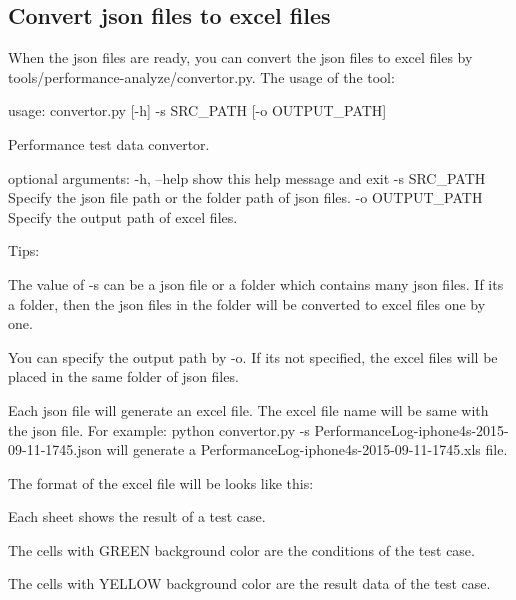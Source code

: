 \subsection*{Convert json files to excel files}

When the json files are ready, you can convert the json files to excel files by {\ttfamily tools/performance-\/analyze/convertor.\+py}. The usage of the tool\+:


\begin{DoxyCode}
usage: convertor.py [-h] -s SRC\_PATH [-o OUTPUT\_PATH]

Performance test data convertor.

optional arguments:
  -h, --help      show this help message and exit
  -s SRC\_PATH     Specify the json file path or the folder path of json files.
  -o OUTPUT\_PATH  Specify the output path of excel files.
\end{DoxyCode}


Tips\+:


\begin{DoxyItemize}
\item The value of {\ttfamily -\/s} can be a json file or a folder which contains many json files. If it\textquotesingle{}s a folder, then the json files in the folder will be converted to excel files one by one.
\item You can specify the output path by {\ttfamily -\/o}. If it\textquotesingle{}s not specified, the excel files will be placed in the same folder of json files.
\item Each json file will generate an excel file. The excel file name will be same with the json file. For example\+: {\ttfamily python convertor.\+py -\/s Performance\+Log-\/iphone4s-\/2015-\/09-\/11-\/1745.\+json} will generate a {\ttfamily Performance\+Log-\/iphone4s-\/2015-\/09-\/11-\/1745.\+xls} file.
\item The format of the excel file will be looks like this\+:


\begin{DoxyEnumerate}
\item Each sheet shows the result of a test case.
\item The cells with G\+R\+E\+EN background color are the conditions of the test case.
\item The cells with Y\+E\+L\+L\+OW background color are the result data of the test case. 
\end{DoxyEnumerate}
\end{DoxyItemize}